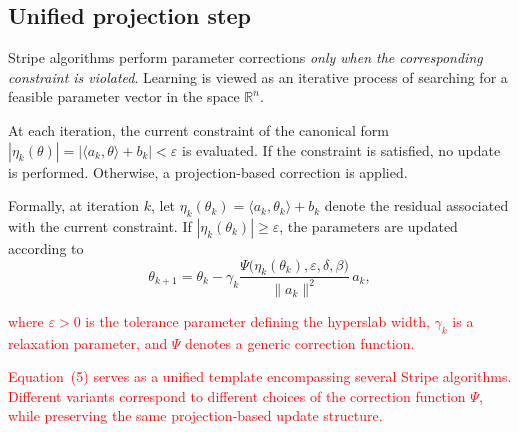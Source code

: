 \documentclass[a4paper,fleqn]{cas-sc}
\begin{document}
\subsection{Unified projection step}

Stripe algorithms perform parameter corrections \emph{only when the corresponding
constraint is violated}.
Learning is viewed as an iterative process of searching for a feasible parameter
vector in the space $\mathbb{R}^n$.

At each iteration, the current constraint of the canonical form $|\eta_k(\theta)| = \bigl|\langle a_k,\theta\rangle + b_k\bigr| < \varepsilon $ is evaluated. If the constraint is satisfied, no update is performed. Otherwise, a projection-based correction is applied.

Formally, at iteration $k$, let
$
\eta_k(\theta_k)=\langle a_k,\theta_k\rangle+b_k
$
denote the residual associated with the current constraint.
If $|\eta_k(\theta_k)| \ge \varepsilon$,
the parameters are updated according to
\begin{equation}
\label{eq:general_update}
\theta_{k+1}
=
\theta_k
-
\gamma_k
\frac{\Psi\bigl(\eta_k(\theta_k),\varepsilon,\delta,\beta\bigr)}{\|a_k\|^2}\,a_k,
\end{equation}




\textcolor{red}{where $\varepsilon > 0$ is the tolerance parameter defining the hyperslab width,
$\gamma_k$ is a relaxation parameter, and $\Psi$ denotes a generic correction function.}

\textcolor{red}{Equation~(5) serves as a unified template encompassing several
Stripe algorithms. Different variants correspond to different
choices of the correction function $\Psi$, while preserving the
same projection-based update structure.}
\end{document}
